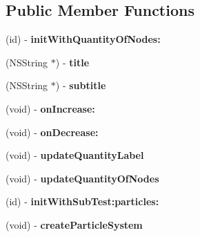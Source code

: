 \subsection*{Public Member Functions}
\begin{DoxyCompactItemize}
\item 
\hypertarget{interface_main_scene_abf42c96b74ae947a917d91a458450e06}{(id) -\/ {\bfseries init\-With\-Quantity\-Of\-Nodes\-:}}\label{interface_main_scene_abf42c96b74ae947a917d91a458450e06}

\item 
\hypertarget{interface_main_scene_abc916548d7cb3935ee6435d0009eaec5}{(N\-S\-String $\ast$) -\/ {\bfseries title}}\label{interface_main_scene_abc916548d7cb3935ee6435d0009eaec5}

\item 
\hypertarget{interface_main_scene_a1e5cd6aba7a3cb59dcaa03689104ef8c}{(N\-S\-String $\ast$) -\/ {\bfseries subtitle}}\label{interface_main_scene_a1e5cd6aba7a3cb59dcaa03689104ef8c}

\item 
\hypertarget{interface_main_scene_a5b6f9375003329c0b620fe2924b12bd6}{(void) -\/ {\bfseries on\-Increase\-:}}\label{interface_main_scene_a5b6f9375003329c0b620fe2924b12bd6}

\item 
\hypertarget{interface_main_scene_a832bb3db2585999e80f593859c3779f7}{(void) -\/ {\bfseries on\-Decrease\-:}}\label{interface_main_scene_a832bb3db2585999e80f593859c3779f7}

\item 
\hypertarget{interface_main_scene_a4aab23a9ba5dd5935bdd829c6135738c}{(void) -\/ {\bfseries update\-Quantity\-Label}}\label{interface_main_scene_a4aab23a9ba5dd5935bdd829c6135738c}

\item 
\hypertarget{interface_main_scene_ab322dc26ada732f3d96f82813e473a4b}{(void) -\/ {\bfseries update\-Quantity\-Of\-Nodes}}\label{interface_main_scene_ab322dc26ada732f3d96f82813e473a4b}

\item 
\hypertarget{interface_main_scene_a40f84a3412063eaa46c5f87f992fd4e7}{(id) -\/ {\bfseries init\-With\-Sub\-Test\-:particles\-:}}\label{interface_main_scene_a40f84a3412063eaa46c5f87f992fd4e7}

\item 
\hypertarget{interface_main_scene_a13ee10db5de6f0801edfac0ff66ca7a3}{(void) -\/ {\bfseries create\-Particle\-System}}\label{interface_main_scene_a13ee10db5de6f0801edfac0ff66ca7a3}


\end{DoxyCompactItemize}
